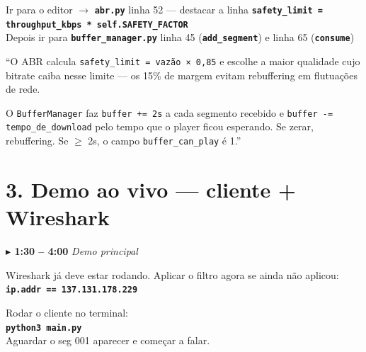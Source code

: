 \documentclass[12pt,a4paper]{article}
\newcommand{\cmd}[1]{\texttt{\textbf{#1}}}
\newcommand{\tempo}[2]{%
  \vspace{5pt}
  \begin{tcolorbox}[base,colback=ctempo!8,colframe=ctempo,boxrule=1pt,
    left=6pt,right=6pt,top=2pt,bottom=2pt]
  \textcolor{ctempo}{\textbf{$\blacktriangleright$ #1}}%
  \hfill\textcolor{ctempo}{\small\textit{#2}}
  \end{tcolorbox}\vspace{3pt}}
\begin{document}
\begin{acaobox}
Ir para o editor $\to$ \cmd{abr.py} linha 52 — destacar a linha \cmd{safety\_limit = throughput\_kbps * self.SAFETY\_FACTOR}\\[4pt]
Depois ir para \cmd{buffer\_manager.py} linha 45 (\cmd{add\_segment}) e linha 65 (\cmd{consume})
\end{acaobox}

\vspace{3pt}

\begin{falabox}
``O ABR calcula \texttt{safety\_limit = vazão × 0,85} e escolhe a maior qualidade
cujo bitrate caiba nesse limite — os 15\% de margem evitam rebuffering em
flutuações de rede.

O \texttt{BufferManager} faz \texttt{buffer += 2s} a cada segmento recebido e
\texttt{buffer -= tempo\_de\_download} pelo tempo que o player ficou esperando.
Se zerar, rebuffering. Se $\geq$ 2s, o campo \texttt{buffer\_can\_play} é 1.''
\end{falabox}

\section{3. Demo ao vivo — cliente + Wireshark}

\tempo{1:30 – 4:00}{Demo principal}

\begin{alertabox}
Wireshark já deve estar rodando. Aplicar o filtro agora se ainda não aplicou:\\
\cmd{ip.addr == 137.131.178.229}
\end{alertabox}

\vspace{3pt}

\begin{acaobox}
Rodar o cliente no terminal:\\[4pt]
\cmd{python3 main.py}\\[4pt]
Aguardar o seg 001 aparecer e começar a falar.
\end{acaobox}

\vspace{3pt}
\end{document}
